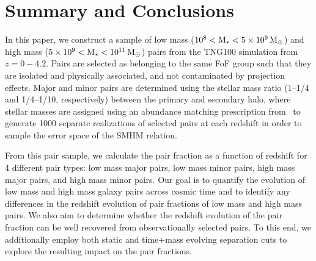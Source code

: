\documentclass[twocolumn]{aastex631}
\begin{document}
\section{Summary and Conclusions}\label{sec:summary}
In this paper, we construct a sample of low mass ($\rm 10^8<M_*<5\times10^9\,\mathrm{M}_\odot$) and high mass ($\rm 5\times10^9<M_*<10^{11}\,\mathrm{M}_\odot$) pairs from the TNG100 simulation from $z=0-4.2$. Pairs are selected as belonging to the same FoF group such that they are isolated and physically associated, and not contaminated by projection effects.
Major and minor pairs are determined using the stellar mass ratio (1--1/4 and 1/4--1/10, respectively) between the primary and secondary halo, where stellar masses are assigned using an abundance matching prescription from~\cite{Moster2013} to generate 1000 separate realizations of selected pairs at each redshift in order to sample the error space of the SMHM relation.

From this pair sample, we calculate the pair fraction as a function of redshift for 4 different pair types: low mass major pairs, low mass minor pairs, high mass major pairs, and high mass minor pairs. 
Our goal is to quantify the evolution of low mass and high mass galaxy pairs across cosmic time and to identify any differences in the redshift evolution of pair fractions of low mass and high mass pairs.
We also aim to determine whether the redshift evolution of the pair fraction can be well recovered from observationally selected pairs. 
To this end, we additionally employ both static and time+mass evolving separation cuts to explore the resulting impact on the pair fractions.
\end{document}
